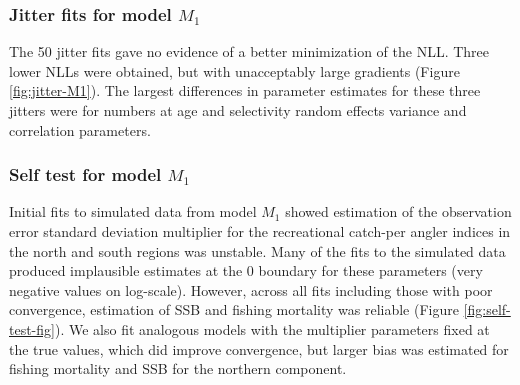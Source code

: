 \documentclass[
]{article}
\begin{document}
\hypertarget{jitter-fits-for-model-m_1}{%
\subsubsection*{\texorpdfstring{Jitter fits for model \(M_1\)}{Jitter fits for model M\_1}}\label{jitter-fits-for-model-m_1}}

The 50 jitter fits gave no evidence of a better minimization of the NLL. Three lower NLLs were obtained, but with unacceptably large gradients (Figure \ref{fig:jitter-M1}). The largest differences in parameter estimates for these three jitters were for numbers at age and selectivity random effects variance and correlation parameters.

\hypertarget{self-test-for-model-m_1}{%
\subsubsection*{\texorpdfstring{Self test for model \(M_1\)}{Self test for model M\_1}}\label{self-test-for-model-m_1}}

Initial fits to simulated data from model \(M_1\) showed estimation of the observation error standard deviation multiplier for the recreational catch-per angler indices in the north and south regions was unstable. Many of the fits to the simulated data produced implausible estimates at the 0 boundary for these parameters (very negative values on log-scale). However, across all fits including those with poor convergence, estimation of SSB and fishing mortality was reliable (Figure \ref{fig:self-test-fig}). We also fit analogous models with the multiplier parameters fixed at the true values, which did improve convergence, but larger bias was estimated for fishing mortality and SSB for the northern component.

\setcounter{table}{0}
\renewcommand\thetable{S\arabic{table}}
\end{document}
